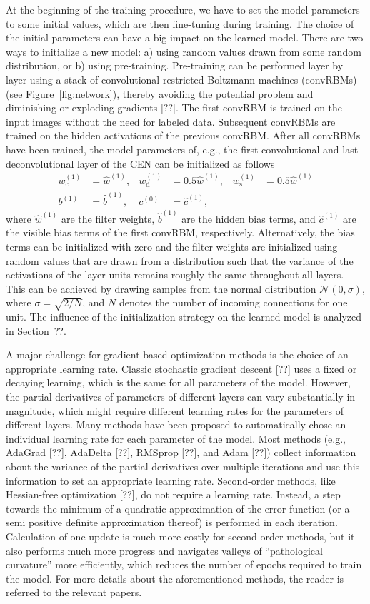 At the beginning of the training procedure, we have to set the model parameters
to some initial values, which are then fine-tuning during training. The choice
of the initial parameters can have a big impact on the learned model. There are
two ways to initialize a new model: a) using random values drawn from some
random distribution, or b) using pre-training. Pre-training can be performed
layer by layer using a stack of convolutional restricted Boltzmann machines
(convRBMs) (see Figure~\ref{fig:network}), thereby avoiding the potential
problem and diminishing or exploding gradients [??]. The first convRBM is
trained on the input images without the need for labeled data. Subsequent
convRBMs are trained on the hidden activations of the previous convRBM. After
all convRBMs have been trained, the model parameters of, e.g., the first
convolutional and last deconvolutional layer of the CEN can be initialized as
follows
\begin{align}
w_{\text{c}}^{(1)} &= \hat{w}^{(1)}, &
w_{\text{d}}^{(1)} &= 0.5\hat{w}^{(1)}, &
w_{\text{s}}^{(1)} &= 0.5\hat{w}^{(1)} \\
b^{(1)} &= \hat{b}^{(1)}, &
c^{(0)} &= \hat{c}^{(1)},
\end{align}
where $\hat{w}^{(1)}$ are the filter weights, $\hat{b}^{(1)}$ are the hidden
bias terms, and $\hat{c}^{(1)}$ are the visible bias terms of the first convRBM,
respectively. Alternatively, the bias terms can be initialized with zero and the
filter weights are initialized using random values that are drawn from a
distribution such that the variance of the activations of the layer units
remains roughly the same throughout all layers. This can be achieved by drawing
samples from the normal distribution $\mathcal{N}(0, \sigma)$, where $\sigma =
\sqrt{2/N}$, and $N$ denotes the number of incoming connections for one unit.
The influence of the initialization strategy on the learned model is analyzed in
Section~??.

A major challenge for gradient-based optimization methods is the choice of an
appropriate learning rate. Classic stochastic gradient descent [??] uses a fixed
or decaying learning, which is the same for all parameters of the model. However,
the partial derivatives of parameters of different layers can vary substantially
in magnitude, which might require different learning rates for the parameters of
different layers. Many methods have been proposed to automatically chose an
individual learning rate for each parameter of the model. Most methods (e.g.,
AdaGrad [??], AdaDelta [??], RMSprop [??], and Adam [??]) collect information
about the variance of the partial derivatives over multiple iterations and use
this information to set an appropriate learning rate. Second-order methods, like
Hessian-free optimization [??], do not require a learning rate. Instead, a step
towards the minimum of a quadratic approximation of the error function (or a
semi positive definite approximation thereof) is performed in each iteration.
Calculation of one update is much more costly for second-order methods, but it
also performs much more progress and navigates valleys of ``pathological
curvature'' more efficiently, which reduces the number of epochs required to
train the model. For more details about the aforementioned methods, the reader
is referred to the relevant papers.
